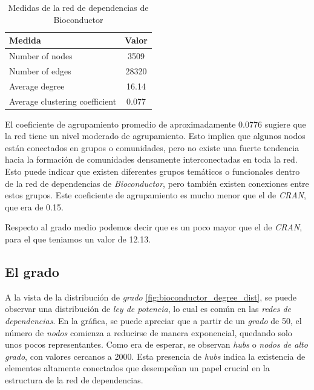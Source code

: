 \begin{table}[h!]
    \begin{center}
        \begin{tabular}{|l|c|}
            \hline
            \textbf{Medida}                & \textbf{Valor} \\
            \hline
            Number of nodes                & 3509           \\
            Number of edges                & 28320          \\
            Average degree                 & 16.14          \\
            Average clustering coefficient & 0.077          \\
            \hline
        \end{tabular}
        \caption{Medidas de la red de dependencias de Bioconductor}
        \label{tab:Medidas de la red de dependencias de Bioconductor}
    \end{center}
\end{table}

El coeficiente de agrupamiento promedio de aproximadamente 0.0776 sugiere que la red tiene un nivel moderado de agrupamiento.
Esto implica que algunos nodos están conectados en grupos o comunidades, pero no existe una fuerte tendencia hacia la formación
de comunidades densamente interconectadas en toda la red. Esto puede indicar que existen diferentes grupos temáticos o
funcionales dentro de la red de dependencias de \textit{Bioconductor}, pero también existen conexiones entre estos grupos.
Este coeficiente de agrupamiento es mucho menor que el de \textit{CRAN}, que era de 0.15.

Respecto al grado medio podemos decir que es un poco mayor que el de \textit{CRAN},
para el que teniamos un valor de 12.13.

\subsection{El grado}

A la vista de la distribución de \emph{grado} \ref{fig:bioconductor_degree_dist}, se puede observar una distribución
de \emph{ley de potencia}, lo cual es común en las \emph{redes de dependencias}.
En la gráfica, se puede apreciar que a partir de un \emph{grado} de 50, el
número de \emph{nodos} comienza a reducirse de manera exponencial, quedando
solo unos pocos representantes. Como era de esperar, se observan \emph{hubs}
o \emph{nodos de alto grado}, con valores cercanos a 2000. Esta presencia
de \emph{hubs} indica la existencia de elementos altamente conectados que
desempeñan un papel crucial en la estructura de la red de dependencias.


